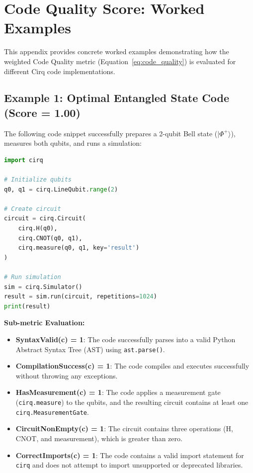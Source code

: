 \section{Code Quality Score: Worked Examples}
\label{sec:appendix_c_quality}

This appendix provides concrete worked examples demonstrating how the weighted Code Quality metric (Equation~\ref{eq:code_quality}) is evaluated for different Cirq code implementations.

\subsection{Example 1: Optimal Entangled State Code (Score = 1.00)}
The following code snippet successfully prepares a 2-qubit Bell state ($|\Phi^+\rangle$), measures both qubits, and runs a simulation:

\begin{lstlisting}[language=Python]
import cirq

# Initialize qubits
q0, q1 = cirq.LineQubit.range(2)

# Create circuit
circuit = cirq.Circuit(
    cirq.H(q0),
    cirq.CNOT(q0, q1),
    cirq.measure(q0, q1, key='result')
)

# Run simulation
sim = cirq.Simulator()
result = sim.run(circuit, repetitions=1024)
print(result)
\end{lstlisting}

\noindent
\textbf{Sub-metric Evaluation:}
\begin{itemize}
    \item \textbf{SyntaxValid(c) = 1}: The code successfully parses into a valid Python Abstract Syntax Tree (AST) using \texttt{ast.parse()}.
    \item \textbf{CompilationSuccess(c) = 1}: The code compiles and executes successfully without throwing any exceptions.
    \item \textbf{HasMeasurement(c) = 1}: The code applies a measurement gate (\texttt{cirq.measure}) to the qubits, and the resulting circuit contains at least one \texttt{cirq.MeasurementGate}.
    \item \textbf{CircuitNonEmpty(c) = 1}: The circuit contains three operations (H, CNOT, and measurement), which is greater than zero.
    \item \textbf{CorrectImports(c) = 1}: The code contains a valid import statement for \texttt{cirq} and does not attempt to import unsupported or deprecated libraries.
\end{itemize}

